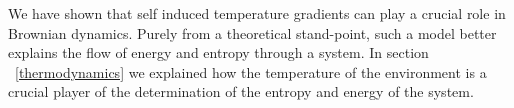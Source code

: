 We have shown that self induced temperature gradients can play a crucial role in Brownian dynamics. Purely from a theoretical stand-point, such a model better explains the flow of energy and entropy through a system. In section ~\autoref{thermodynamics} we explained how the temperature of the environment is a crucial player of the determination of the entropy and energy of the system.
